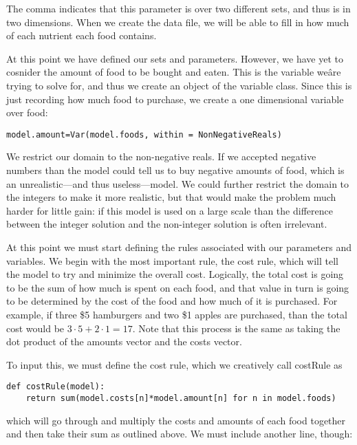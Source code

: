 \documentclass{article}
\begin{document}
The comma indicates that this parameter is over two different sets, and thus is in two dimensions.  When we create the data file, we will be able to fill in how much of each nutrient each food contains.

At this point we have defined our sets and parameters.  However, we have yet to cosnider the amount of food to be bought and eaten.  This is the variable weâre trying to solve for, and thus we create an object of the variable class.  Since this is just recording how much food to purchase, we create a one dimensional variable over food:

\begin{verbatim}model.amount=Var(model.foods, within = NonNegativeReals) \end{verbatim}

We restrict our domain to the non-negative reals.  If we accepted negative numbers than the model could tell us to buy negative amounts of food, which is an unrealistic---and thus useless---model.  We could further restrict the domain to the integers to make it more realistic, but that would make the problem much harder for little gain: if this model is used on a large scale than the difference between the integer solution and the non-integer solution is often irrelevant.

At this point we must start defining the rules associated with our parameters and variables.  We begin with the most important rule, the cost rule, which will tell the model to try and minimize the overall cost.  Logically, the total cost is going to be the sum of how much is spent on each food, and that value in turn is going to be determined by the cost of the food and how much of it is purchased.  For example, if three \$5 hamburgers and two \$1 apples are purchased, than the total cost would be $3 \cdot 5 + 2 \cdot 1 = 17$.  Note that this process is the same as taking the dot product of the amounts vector and the costs vector.

To input this, we must define the cost rule, which we creatively call costRule as 

\begin{verbatim}def costRule(model):
    return sum(model.costs[n]*model.amount[n] for n in model.foods)
\end{verbatim}

\noindent
which will go through and multiply the costs and amounts of each food together and then take their sum as outlined above.  We must include another line, though:
\end{document}
